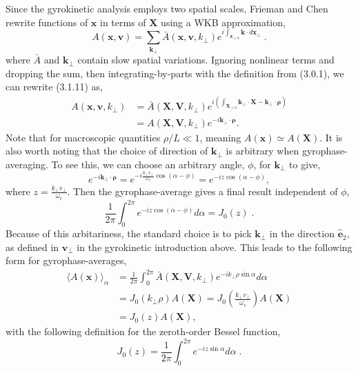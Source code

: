 \documentclass[12pt]{article}
\numberwithin{equation}{subsection}
\begin{document}
   \quad Since the gyrokinetic analysis employs two spatial scales, Frieman and Chen rewrite functions of $\bm{x}$ in terms of $\bm{X}$ using
a WKB approximation\cite{FriemanChen},
   \begin{equation}
      A(\bm{x}, \bm{v}) = \sum\limits_{\bm{k}_\perp}\bar{A}(\bm{x},\bm{v},k_\perp)e^{i\int_{\bm{x}_{\perp 0}}\bm{k}\cdot d\bm{x}_\perp}\;.
   \end{equation}
where $\bar{A}$ and $\bm{k}_\perp$ contain slow spatial variations. Ignoring nonlinear terms and dropping the sum, then integrating-by-parts
with the definition from (3.0.1), we can rewrite (3.1.11) as\cite{FriemanChen},
   \begin{equation}
   \begin{aligned}
      A(\bm{x}, \bm{v}, k_\perp) &= \bar{A}(\bm{X},\bm{V},k_\perp)e^{i(\int_{\bm{X}_{\perp 0}}\bm{k}_\perp\cdot\bm{X} - \bm{k}_\perp\cdot\bm{\rho})} \\
                                 &= A(\bm{X},\bm{V},k_\perp)e^{-i \bm{k}_\perp\cdot\bm{\rho}}.
   \end{aligned}                              
   \end{equation}
Note that for macroscopic quantities $\rho/L \ll 1$, meaning $A(\bm{x}) \simeq A(\bm{X})$.  It is also worth noting that the choice of direction of
$\bm{k}_\perp$ is arbitrary when gyrophase-averaging. To see this, we can choose an arbitrary angle, $\phi$, for $\bm{k}_\perp$ to give,
   \begin{equation}
      e^{-i\bm{k}_\perp\cdot\bm{\rho}} = e^{-i\frac{k_\perp v_\perp}{\omega_c}\cos(\alpha - \phi)} = e^{-iz\cos(\alpha-\phi)},
   \end{equation}
where $z = \frac{k_\perp v_\perp}{\omega_c}$. Then the gyrophase-average gives a final result independent of $\phi$,
   \begin{equation}
      \frac{1}{2\pi}\int_{0}^{2\pi}e^{-iz\cos(\alpha-\phi)}d\alpha = J_0(z)\;.
   \end{equation}
Because of this arbitariness, the standard choice is to pick $\bm{k}_\perp$ in the direction $\bm{\hat{e}}_2$, as defined in
$\bm{v}_\perp$ in the gyrokinetic introduction above. This leads to the following form
for gyrophase-averages,
   \begin{equation}
   \begin{aligned}
      \langle A(\bm{x})\rangle_\alpha &= \frac{1}{2\pi}\int_{0}^{2\pi}\bar{A}(\bm{X},\bm{V},k_\perp)e^{-i k_\perp\rho\sin\alpha} d\alpha \\
                                      &= J_0(k_\perp \rho) A(\bm{X}) = J_0(\frac{k_\perp v_{\perp}}{\omega_c})A(\bm{X}) \\
                                      &= J_0(z)A(\bm{X}),
   \end{aligned}
   \end{equation}
with the following definition for the zeroth-order Bessel function,
   \begin{equation}
      J_0(z) = \frac{1}{2\pi}\int_{0}^{2\pi}e^{-iz\sin\alpha}d\alpha\;.
   \end{equation}
\end{document}
